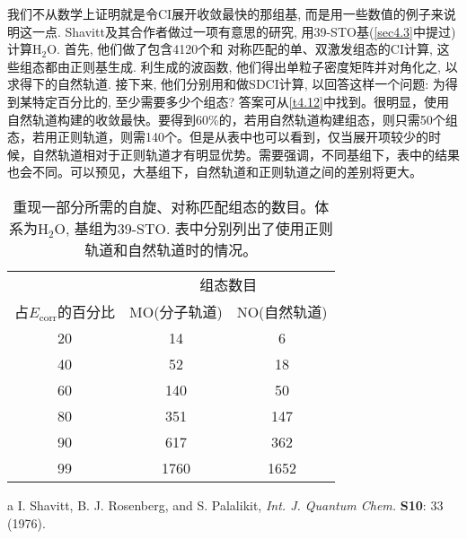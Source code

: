 我们不从数学上证明就是令CI展开收敛最快的那组基, 
而是用一些数值的例子来说明这一点. 
Shavitt及其合作者做过一项有意思的研究, 
用39-STO基(\autoref{sec4.3}中提过)计算$\mathrm{H_2O}$. 
首先, 
他们做了包含4120个和\mci
{对称匹配}的单、双激发组态的CI计算, 这些组态都由正则\hft 基生成. 利生成的波函数, 他们得出单粒子密度矩阵并对角化之, 以求得下的自然轨道. 接下来, 他们分别用和做SDCI计算, 以回答这样一个问题: 为得到某特定百分比的, 至少需要多少个组态? 答案可从\autoref{t4.12}中找到。很明显，使用自然轨道构建的收敛最快。要得到60\%的，若用自然轨道构建组态，则只需50个组态，若用正则轨道，则需140个。但是从表中也可以看到，仅当展开项较少的时候，自然轨道相对于正则轨道才有明显优势。需要强调，不同基组下，表中的结果也会不同。可以预见，大基组下，自然轨道和正则轨道之间的差别将更大。
\begin{table}[H]
	\centering
	\begin{threeparttable}
		\caption{重现一部分所需的自旋、对称匹配组态的数目。体系为$\mathrm{H_2O}$, 基组为39-STO. 表中分别列出了使用正则轨道和自然轨道时的情况。}
		\label{t4.12}
		\begin{tabular}{ccc}
			\hline
			& \multicolumn{2}{c}{组态数目} \\ \cline{2-3}
			占$E_\mathrm{corr}$的百分比 & MO(分子轨道) &   NO(自然轨道) \\ \hline
			20               &    14        &       6       \\
			40               &    52        &      18       \\
			60               &   140        &      50       \\
			80               &   351        &      147      \\
			90               &   617        &      362      \\
			99               &   1760       &     1652      \\ \hline
		\end{tabular}
		\begin{tablenotes}
			\item[a] I. Shavitt, B. J. Rosenberg, and S. Palalikit, \textit{Int. J. Quantum Chem.} \textbf{S10}: 33 (1976).
		\end{tablenotes}
	\end{threeparttable}
\end{table}
